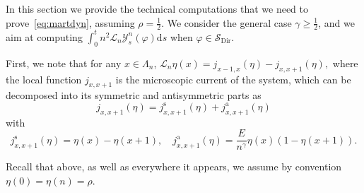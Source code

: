 \documentclass[AHL,Unicode,longabstracts]{cedram}
\DeclareMathOperator{\Dir}{Dir}
\newcommand*{\rms}{\mathrm{s}}
\newcommand*{\rma}{\mathrm{a}}
\newcommand{\mc}[1]{{\mathcal #1}}
\renewcommand{\mc}[1]{{\mathcal #1}}
\newcommand{\SD}{\ensuremath{\mc S_{\Dir}}}
\renewcommand{\geq}{\geqslant}
\newcommand*{\dd}{\mathrm{d}}
\newcommand*{\ds}{\dd s}
\begin{document}
In this section we provide the technical computations that we need to prove~\eqref{eq:martdyn}, assuming $\rho=\frac12$. We consider the general case $\gamma \geq \frac12$, and we aim at computing $\int_0^t n^2\mc L_n \mc Y_s^n(\varphi)\ds$ when $\varphi \in \SD$.

First, we note that for any $x\in\Lambda_n$, $
\mathcal L_n \eta(x)=j_{x-1,x}(\eta)-j_{x,x+1}(\eta), $ where the local function $j_{x,x+1}$ is the microscopic current of the system, which can be decomposed into its symmetric and antisymmetric parts as
\[
j_{x,x+1}(\eta)=j^{\rms}_{x,x+1}(\eta)+j^{\rma}_{x,x+1}(\eta)
\]
with
\[
j^{\rms}_{x,x+1}(\eta) =\eta(x)-\eta(x+1), \quad j^{\rma}_{x,x+1}(\eta)=\frac{E}{n^\gamma}\eta(x)(1-\eta(x+1)).
\]

Recall that above, as well as everywhere it appears, we assume by convention $\eta(0)=\eta(n)=\rho$.
\end{document}
